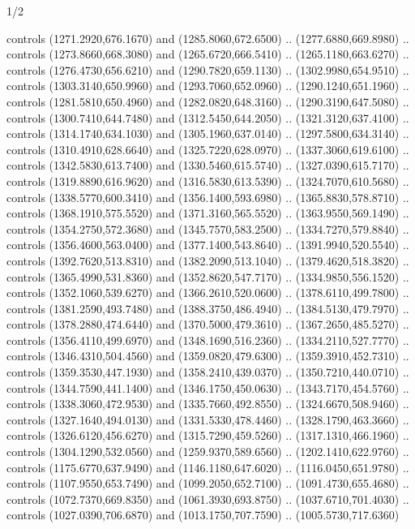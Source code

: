 \begin{flagdescription}{1/2}
\begin{scope}[xshift=\flagwidth/10+\flaglength/2,yshift=0.5778\flagwidth,scale=\flagwidth/512]
\begin{scope}[x=1.13,y=-1.13pt,xshift=-610.5,yshift=237,fill=gold]
\begin{scope}[cm={{0.5,0.0,0.0,0.5,(0.0,0.0)}}]
  controls (1271.2920,676.1670) and (1285.8060,672.6500) .. (1277.6880,669.8980)
  .. controls (1273.8660,668.3080) and (1265.6720,666.5410) ..
  (1265.1180,663.6270) .. controls (1276.4730,656.6210) and (1290.7820,659.1130)
  .. (1302.9980,654.9510) .. controls (1303.3140,650.9960) and
  (1293.7060,652.0960) .. (1290.1240,651.1960) .. controls (1281.5810,650.4960)
  and (1282.0820,648.3160) .. (1290.3190,647.5080) .. controls
  (1300.7410,644.7480) and (1312.5450,644.2050) .. (1321.3120,637.4100) ..
  controls (1314.1740,634.1030) and (1305.1960,637.0140) .. (1297.5800,634.3140)
  .. controls (1310.4910,628.6640) and (1325.7220,628.0970) ..
  (1337.3060,619.6100) .. controls (1342.5830,613.7400) and (1330.5460,615.5740)
  .. (1327.0390,615.7170) .. controls (1319.8890,616.9620) and
  (1316.5830,613.5390) .. (1324.7070,610.5680) .. controls (1338.5770,600.3410)
  and (1356.1400,593.6980) .. (1365.8830,578.8710) .. controls
  (1368.1910,575.5520) and (1371.3160,565.5520) .. (1363.9550,569.1490) ..
  controls (1354.2750,572.3680) and (1345.7570,583.2500) .. (1334.7270,579.8840)
  .. controls (1356.4600,563.0400) and (1377.1400,543.8640) ..
  (1391.9940,520.5540) .. controls (1392.7620,513.8310) and (1382.2090,513.1040)
  .. (1379.4620,518.3820) .. controls (1365.4990,531.8360) and
  (1352.8620,547.7170) .. (1334.9850,556.1520) .. controls (1352.1060,539.6270)
  and (1366.2610,520.0600) .. (1378.6110,499.7800) .. controls
  (1381.2590,493.7480) and (1388.3750,486.4940) .. (1384.5130,479.7970) ..
  controls (1378.2880,474.6440) and (1370.5000,479.3610) .. (1367.2650,485.5270)
  .. controls (1356.4110,499.6970) and (1348.1690,516.2360) ..
  (1334.2110,527.7770) .. controls (1346.4310,504.4560) and (1359.0820,479.6300)
  .. (1359.3910,452.7310) .. controls (1359.3530,447.1930) and
  (1358.2410,439.0370) .. (1350.7210,440.0710) .. controls (1344.7590,441.1400)
  and (1346.1750,450.0630) .. (1343.7170,454.5760) .. controls
  (1338.3060,472.9530) and (1335.7660,492.8550) .. (1324.6670,508.9460) ..
  controls (1327.1640,494.0130) and (1331.5330,478.4460) .. (1328.1790,463.3660)
  .. controls (1326.6120,456.6270) and (1315.7290,459.5260) ..
  (1317.1310,466.1960) .. controls (1304.1290,532.0560) and (1259.9370,589.6560)
  .. (1202.1410,622.9760) .. controls (1175.6770,637.9490) and
  (1146.1180,647.6020) .. (1116.0450,651.9780) .. controls (1107.9550,653.7490)
  and (1099.2050,652.7100) .. (1091.4730,655.4680) .. controls
  (1072.7370,669.8350) and (1061.3930,693.8750) .. (1037.6710,701.4030) ..
  controls (1027.0390,706.6870) and (1013.1750,707.7590) .. (1005.5730,717.6360)

\end{scope}
\end{scope}
\end{scope}
\end{flagdescription}
